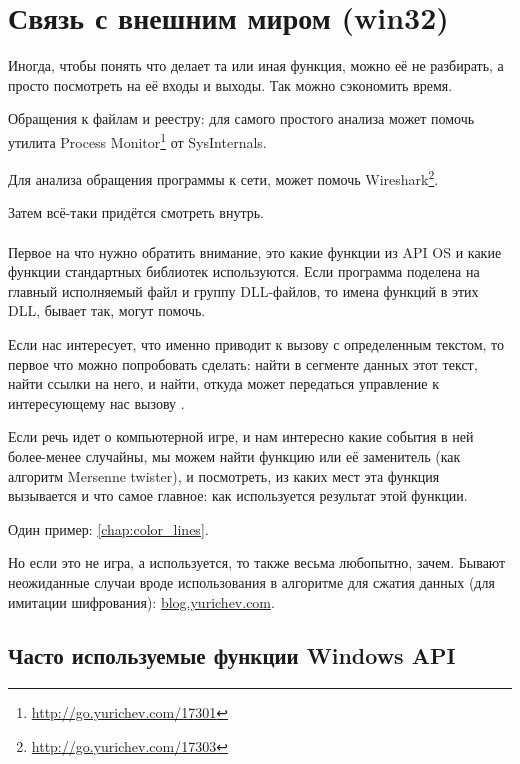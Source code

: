 \section{Связь с внешним миром (win32)}

Иногда, чтобы понять что делает та или иная функция, можно её не разбирать, а просто посмотреть на её входы и выходы.
Так можно сэкономить время.

Обращения к файлам и реестру: 
для самого простого анализа может помочь утилита Process Monitor\footnote{\url{http://go.yurichev.com/17301}}
от SysInternals.

Для анализа обращения программы к сети, может помочь  Wireshark\footnote{\url{http://go.yurichev.com/17303}}.

Затем всё-таки придётся смотреть внутрь. \\
\\
Первое на что нужно обратить внимание, это какие функции из \ac{API} \ac{OS}
и какие функции стандартных библиотек используются.
Если программа поделена на главный исполняемый файл и группу DLL-файлов, то имена функций в этих DLL, бывает так, могут помочь.

Если нас интересует, что именно приводит к вызову  с определенным текстом, 
то первое что можно попробовать сделать: найти в сегменте данных этот текст, найти ссылки на него, и найти, 
откуда может передаться управление к интересующему нас вызову .

Если речь идет о компьютерной игре, и нам интересно какие события в ней более-менее случайны, 
мы можем найти функцию \rand или её заменитель (как алгоритм Mersenne twister), и посмотреть, 
из каких мест эта функция вызывается и что самое главное: как используется результат этой функции.%

Один пример: \ref{chap:color_lines}. 

Но если это не игра, а \rand используется, то также весьма любопытно, зачем. 
Бывают неожиданные случаи вроде использования \rand в алгоритме для сжатия данных (для имитации шифрования):
\href{http://go.yurichev.com/17221}{blog.yurichev.com}.

\subsection{Часто используемые функции Windows API}

